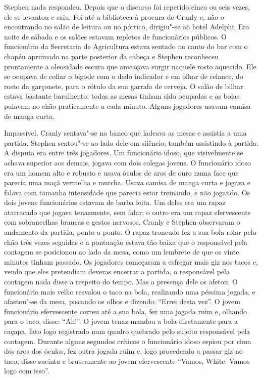 Stephen nada respondeu.  Depois que o discurso foi repetido cinco ou
seis vezes, ele se levantou e saiu.  Foi até a biblioteca à procura de
Cranly e, não o encontrando no salão de leitura ou no pórtico,
dirigiu"-se ao hotel Adelphi.  Era noite de sábado e os salões estavam
repletos de funcionários públicos. O funcionário da Secretaria de
Agricultura estava sentado no canto do bar com o chapéu aprumado na
parte posterior da cabeça e Stephen reconheceu prontamente a oleosidade
escura que ameaçava surgir naquele rosto aquecido.  Ele se ocupava de
cofiar o bigode com o dedo indicador e em olhar de relance, do rosto da
garçonete, para o rótulo da sua garrafa de cerveja.  O salão de bilhar
estava bastante barulhento: todas as mesas tinham sido ocupadas e as
bolas pulavam no chão praticamente a cada minuto.  Alguns jogadores
usavam camisa de manga curta.  

Impassível, Cranly sentava"-se no banco que ladeava as mesas e
assistia a uma partida.  Stephen sentou"-se ao lado dele em silêncio,
também assistindo à partida.  A disputa era entre três jogadores.  Um
funcionário idoso, que visivelmente se achava superior aos demais,
jogava com dois colegas jovens.  O funcionário idoso era um homem alto
e robusto e usava óculos de aros de ouro numa face que parecia uma maçã
vermelha e murcha.  Usava camisa de manga curta e jogava e falava com
tamanha intensidade que parecia estar treinando, e não jogando.  Os
dois jovens funcionários estavam de barba feita.  Um deles era um rapaz
atarracado que jogava tenazmente, sem falar; o outro era um rapaz
efervescente com sobrancelhas brancas e gestos nervosos.  Cranly e
Stephen observaram o andamento da partida, ponto a ponto.  O rapaz
troncudo fez a sua bola rolar pelo chão três vezes seguidas e a
pontuação estava tão baixa que o responsável pela contagem se
posicionou ao lado da mesa, como um lembrete de que os vinte minutos
tinham passado.  Os jogadores começaram a esfregar mais giz nos tacos
e, vendo que eles pretendiam deveras encerrar a partida, o responsável
pela contagem nada disse a respeito do tempo.  Mas a presença dele os
afetou.  O funcionário mais velho resvalou o taco na bola, realizando
uma péssima jogada, e afastou"-se da mesa, piscando os olhos e dizendo:
“Errei desta vez”.  O jovem funcionário efervescente correu até a sua
bola, fez uma jogada ruim e, olhando para o taco, disse: “Ah!”.  O
jovem tenaz mandou a bola diretamente para a caçapa, fato logo
registrado num quadro quebrado pelo sujeito responsável pela contagem. 
Durante alguns segundos críticos o funcionário idoso espiou por cima
dos aros dos óculos, fez outra jogada ruim e, logo procedendo a passar
giz no taco, disse sucinta e bruscamente ao jovem
efervescente “Vamos, White.  Vamos logo com isso”.

